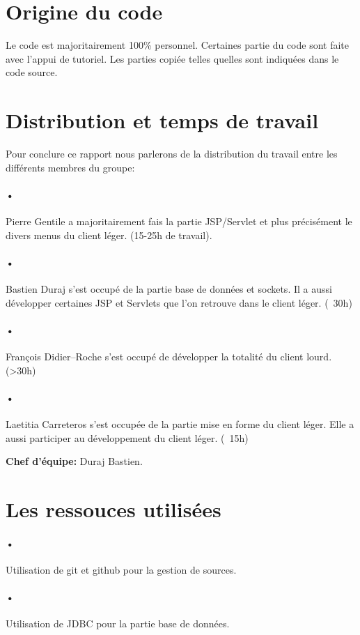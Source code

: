 \documentclass[11pt,a4paper]{article}
\begin{document}
\section{Origine du code}
Le code est majoritairement 100\% personnel. Certaines partie du code
sont faite avec l'appui de tutoriel. Les parties copiée telles quelles
sont indiquées dans le code source.

\section{Distribution et temps de travail}
Pour conclure ce rapport nous parlerons de la distribution du travail entre les différents membres du groupe:\\
\paragraph{•} Pierre Gentile a majoritairement fais la partie
JSP/Servlet et plus précisément le divers menus du client
léger. (15-25h de travail).
\paragraph{•} Bastien Duraj s'est occupé de la partie base de données
et sockets. Il a aussi développer certaines JSP et Servlets que l'on
retrouve dans le client léger.  (~30h)
\paragraph{•} François Didier--Roche s'est occupé de développer la
totalité du client lourd. (>30h)
\paragraph{•} Laetitia Carreteros s'est occupée de la partie mise en
forme du client léger. Elle a aussi participer au développement du
client léger. (~15h)


\textbf{Chef d'équipe:} Duraj Bastien.

\newpage

\section{Les ressouces utilisées}
\paragraph{•} Utilisation de git et github pour la gestion de sources.
\paragraph{•} Utilisation de JDBC pour la partie base de données.
\end{document}
